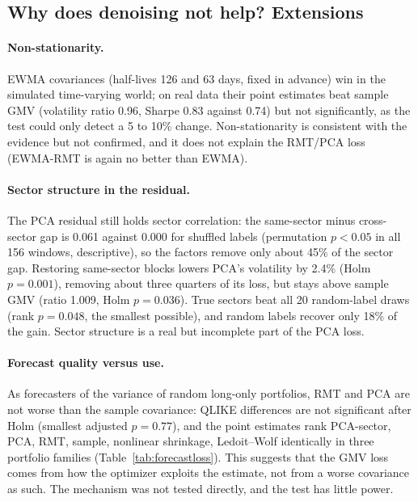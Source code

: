 \documentclass[11pt,a4paper]{article}
\begin{document}
\subsection{Why does denoising not help? Extensions}

\paragraph{Non-stationarity.} EWMA covariances (half-lives 126 and 63 days, fixed in advance) win in the simulated
time-varying world; on real data their point estimates beat sample GMV (volatility ratio 0.96, Sharpe 0.83 against
0.74) but not significantly, as the test could only detect a 5 to 10\% change. Non-stationarity is consistent with
the evidence but not confirmed, and it does not explain the RMT/PCA loss (EWMA-RMT is again no better than EWMA).

\paragraph{Sector structure in the residual.} The PCA residual still holds sector correlation: the same-sector minus
cross-sector gap is 0.061 against 0.000 for shuffled labels (permutation $p<0.05$ in all 156 windows, descriptive), so the factors remove only about 45\% of the sector gap. Restoring same-sector blocks lowers PCA's
volatility by 2.4\% (Holm $p=0.001$), removing about three quarters of its loss, but stays above sample GMV (ratio
1.009, Holm $p=0.036$). True sectors beat all 20 random-label draws (rank $p=0.048$, the smallest possible), and
random labels recover only 18\% of the gain. Sector structure is a real but incomplete part of the PCA loss.

\paragraph{Forecast quality versus use.} As forecasters of the variance of random long-only portfolios, RMT and PCA
are not worse than the sample covariance: QLIKE differences are not significant after Holm (smallest adjusted
$p=0.77$), and the point estimates rank PCA-sector, PCA, RMT, sample, nonlinear shrinkage, Ledoit--Wolf identically
in three portfolio families (Table~\ref{tab:forecastloss}). This suggests that the GMV loss comes from how the
optimizer exploits the estimate, not from a worse covariance as such. The mechanism was not tested directly, and
the test has little power.
\end{document}

